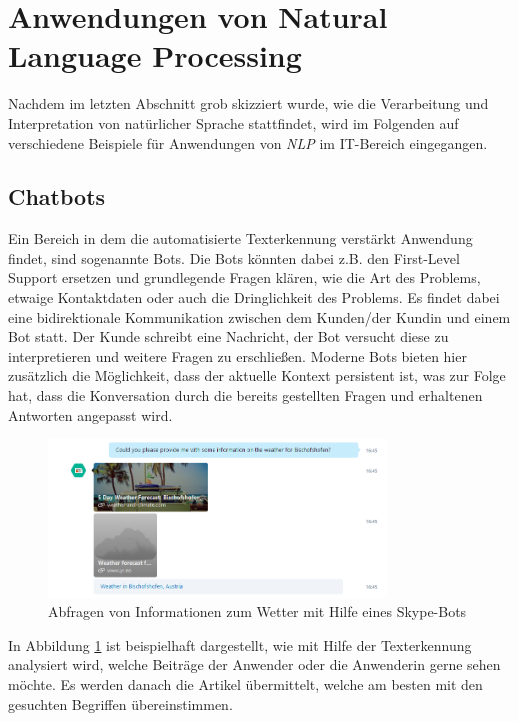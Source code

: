 \section{Anwendungen von Natural Language Processing}
Nachdem im letzten Abschnitt grob skizziert wurde, wie die Verarbeitung und Interpretation von natürlicher Sprache stattfindet, wird im Folgenden auf verschiedene Beispiele für Anwendungen von \textit{NLP} im IT-Bereich eingegangen.

\subsection{Chatbots}
Ein Bereich in dem die automatisierte Texterkennung verstärkt Anwendung findet, sind sogenannte Bots. Die Bots könnten dabei z.B. den First-Level Support ersetzen und grundlegende Fragen klären, wie die Art des Problems, etwaige Kontaktdaten oder auch die Dringlichkeit des Problems. Es findet dabei eine bidirektionale Kommunikation zwischen dem Kunden/der Kundin und einem Bot statt. Der Kunde schreibt eine Nachricht, der Bot versucht diese zu interpretieren und weitere Fragen zu erschließen. Moderne Bots bieten hier zusätzlich die Möglichkeit, dass der aktuelle Kontext persistent ist, was zur Folge hat, dass die Konversation durch die bereits gestellten Fragen und erhaltenen Antworten angepasst wird. 

\begin{figure}[ht]
	\centering
		\includegraphics[width=0.80\textwidth]{images/chatbot.PNG}
	\caption{Abfragen von Informationen zum Wetter mit Hilfe eines Skype-Bots}
	\label{fig:chatbot}
\end{figure}

In Abbildung \ref{fig:chatbot} ist beispielhaft dargestellt, wie mit Hilfe der Texterkennung analysiert wird, welche Beiträge der Anwender oder die Anwenderin gerne sehen möchte. Es werden danach die Artikel übermittelt, welche am besten mit den gesuchten Begriffen übereinstimmen. 

